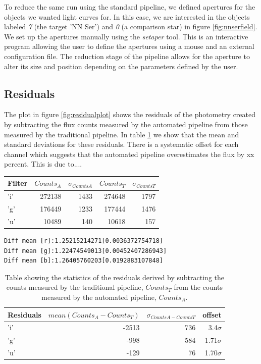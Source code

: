 To reduce the same run using the standard pipeline, we defined apertures for the objects we wanted light curves for. In this case, we are interested in the objects labeled \emph{7} (the target 'NN Ser') and \emph{0} (a comparison star) in figure \ref{fig:nnserfield}. We set up the apertures manually using the \emph{setaper} tool. This is an interactive program allowing the user to define the apertures using a mouse and an external configuration file. The reduction stage of the pipeline allows for the aperture to alter its size and position depending on the parameters defined by the user. 



\subsection{Residuals}
The plot in figure \ref{fig:residualplot} shows the residuals of the photometry created by subtracting the flux counts measured by the automated pipeline from those measured by the traditional pipeline. In table \ref{table:residuals} we show that the mean and standard deviations for these residuals. There is a systematic offset for each channel which suggests that the automated pipeline overestimates the flux by xx percent. This is due to.... 

\begin{center}
	\begin{tabular}{|l|r|r|r|r|}
		\hline
		Filter & $Counts_{A}$ & $\sigma_{Counts A}$ & $Counts_{T}$ & $\sigma_{Counts T}$\\
		\hline
		'i' & 272138 & 1433 &  274648 & 1797\\
		'g' & 176449 & 1233 & 177444  & 1476\\
		'u' & 10489 & 140 & 10618 & 157 \\
		\hline
	\end{tabular}
\end{center}
\begin{verbatim}
Diff mean [r]:1.25215214271[0.0036372754718]
Diff mean [g]:1.22474549013[0.00452407286943]
Diff mean [b]:1.26405760203[0.0192883107848]
\end{verbatim}

\begin{table}[ht]
  \label{table:residuals}
  \caption{Table showing the statistics of the residuals derived by subtracting the counts measured by the traditional pipeline, $Counts_{T}$ from the counts measured by the automated pipeline, $Counts_{A}$.}
  \centering
  \begin{tabular}{|l|r|r|r|}
    \hline
    Residuals & $mean(Counts_{A}-Counts_{T})$ & $\sigma_{CountsA - CountsT}$ & offset\\
    \hline
    'i' & -2513 & 736 & 3.4$\sigma$\\
    'g' & -998 & 584 & 1.71$\sigma$\\
    'u' & -129 & 76 & 1.70$\sigma$\\
    \hline
   \end{tabular}
\end{table}

